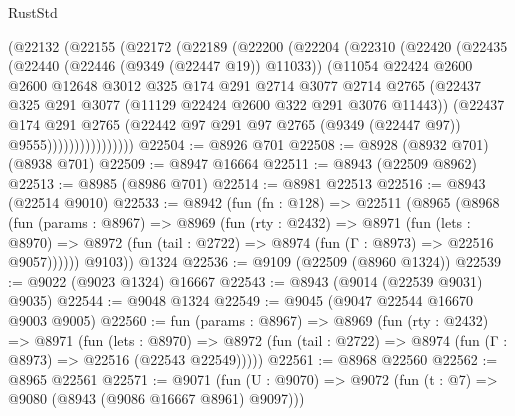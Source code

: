 \begin{lexlean}{RustStd}
\begin{coremodule}
{\begin{coremodule}
{{{{{{{{{{{{{{{{{{{{{{{{{{{{{{{{{{{{{{{            (@22132
              (@22155
                (@22172
                  (@22189
                    (@22200
                      (@22204
                        (@22310
                          (@22420
                            (@22435
                              (@22440 (@22446 (@9349 (@22447 @19)) @11033))
                              (@11054
                                @22424
                                @2600
                                @2600
                                @12648
                                @3012
                                @325
                                @174
                                @291
                                @2714
                                @3077
                                @2714
                                @2765
                                (@22437
                                  @325
                                  @291
                                  @3077
                                  (@11129 @22424 @2600 @322 @291 @3076 @11443))
                                (@22437
                                  @174
                                  @291
                                  @2765
                                  (@22442
                                    @97
                                    @291
                                    @97
                                    @2765
                                    (@9349 (@22447 @97))
                                    @9555))))))))))))))))
@22504 := @8926 @701
@22508 := @8928 (@8932 @701) (@8938 @701)
@22509 := @8947 @16664
@22511 := @8943 (@22509 @8962)
@22513 := @8985 (@8986 @701)
@22514 := @8981 @22513
@22516 := @8943 (@22514 @9010)
@22533 := @8942
    (fun (fn : @128) =>
    @22511
      (@8965
        (@8968
          (fun (params : @8967) =>
          @8969
            (fun (rty : @2432) =>
            @8971
              (fun (lets : @8970) =>
              @8972 (fun (tail : @2722) => @8974 (fun (Γ : @8973) => @22516 @9057))))))
        @9103))
    @1324
@22536 := @9109 (@22509 (@8960 @1324))
@22539 := @9022 (@9023 @1324) @16667
@22543 := @8943 (@9014 (@22539 @9031) @9035)
@22544 := @9048 @1324
@22549 := @9045 (@9047 @22544 @16670 @9003 @9005)
@22560 := fun (params : @8967) =>
  @8969
    (fun (rty : @2432) =>
    @8971
      (fun (lets : @8970) =>
      @8972 (fun (tail : @2722) => @8974 (fun (Γ : @8973) => @22516 (@22543 @22549)))))
@22561 := @8968 @22560
@22562 := @8965 @22561
@22571 := @9071
    (fun (U : @9070) => @9072 (fun (t : @7) => @9080 (@8943 (@9086 @16667 @8961) @9097)))
}}}}}}}}}}}}}}}}}}}}}}}}}}}}}}}}}}}}}}}
\end{coremodule}}
\end{coremodule}
\end{lexlean}
